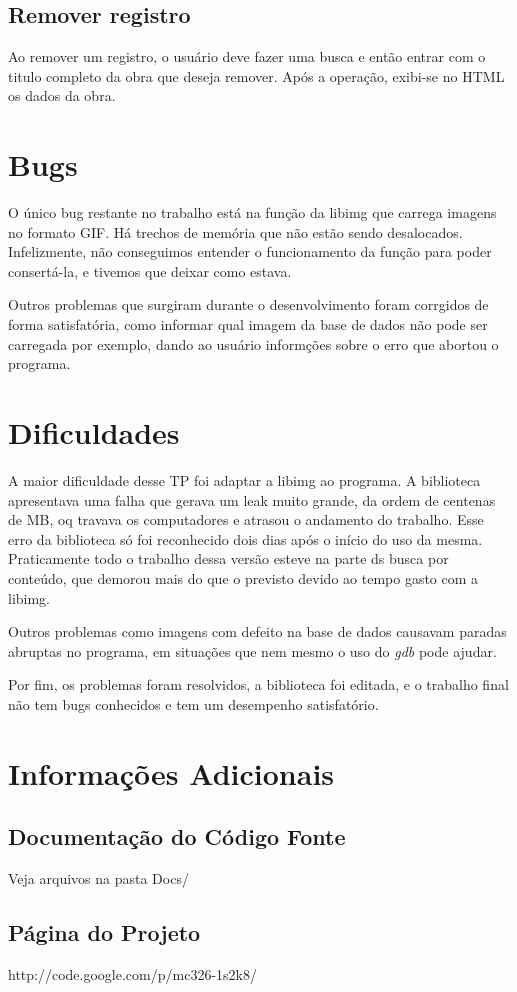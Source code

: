 \documentclass[10pt,a4paper,draft]{article}
\begin{document}
\subsection{Remover registro}
Ao remover um registro, o usuário deve fazer uma busca e então entrar com o titulo completo da obra que deseja remover. Após a operação, exibi-se no HTML os dados da obra.

\section{Bugs}
O único bug restante no trabalho está na função da libimg que carrega imagens no formato GIF. Há trechos de memória que não estão sendo desalocados. Infelizmente, não conseguimos entender o funcionamento da função para poder consertá-la, e tivemos que deixar como estava.

Outros problemas que surgiram durante o desenvolvimento foram corrgidos de forma satisfatória, como informar qual imagem da base de dados não pode ser carregada por exemplo, dando ao usuário informções sobre o erro que abortou o programa.

\section{Dificuldades}
A maior dificuldade desse TP foi adaptar a libimg ao programa. A biblioteca apresentava uma falha que gerava um leak muito grande, da ordem de centenas de MB, oq travava os computadores e atrasou o andamento do trabalho. Esse erro da biblioteca só foi reconhecido dois dias após o início do uso da mesma. Praticamente todo o trabalho dessa versão esteve na parte ds busca por conteúdo, que demorou mais do que o previsto devido ao tempo gasto com a libimg.

Outros problemas como imagens com defeito na base de dados causavam paradas abruptas no programa, em situações que nem mesmo o uso do \textit{gdb} pode ajudar.

Por fim, os problemas foram resolvidos, a biblioteca foi editada, e o trabalho final não tem bugs conhecidos e tem um desempenho satisfatório.

\section{Informações Adicionais}
\subsection{\textbf{Documentação do Código Fonte}}
Veja arquivos na pasta Docs/

\subsection{\textbf{Página do Projeto}}
http://code.google.com/p/mc326-1s2k8/
\end{document}
